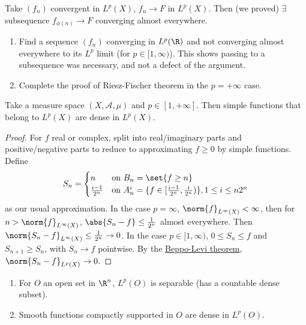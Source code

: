 \documentclass{article}
\begin{document}
\begin{remark}
    Take $(f_n)$ convergent in $L^p(X)$, $f_n \to F$ in $L^p(X)$. Then (we proved) $\exists$ subsequence $f_{\phi(n)} \to F$ converging almost everywhere.
\end{remark}
\begin{ex}
    \leavevmode
    \begin{enumerate}[label=\arabic*)]
        \item Find a sequence $(f_n)$ converging in $L^p(\R)$ and not converging almost everywhere to its $L^p$ limit (for $p \in [1, \infty)$). This shows passing to a subsequence was necessary, and not a defect of the argument.
        \item Complete the proof of Riesz-Fischer theorem in the $p=+\infty$ case.
    \end{enumerate}
\end{ex}

\begin{thm}
    Take a measure space $(X, \mathscr{A}, \mu)$ and $p \in [1, +\infty]$. Then simple functions that belong to $L^p(X)$ are dense in $L^p(X)$.
\end{thm}
\begin{proof}
    For $f$ real or complex, split into real/imaginary parts and positive/negative parts to reduce to approximating $f \geq 0$ by simple functions.
    Define
    \begin{equation*}
        S_n =
        \begin{cases}
            n & \text{on } B_n = \set{f \geq n} \\
            \frac{i-1}{2^n} & \text{on } A_n^i = \{f \in [\frac{i-1}{2^n}, \frac{i}{2^n})\}, 1 \leq i \leq n 2^n
        \end{cases}
    \end{equation*}
    as our usual approximation.
    In the case $p=\infty$, $\norm{f}_{L^\infty(X)} < \infty$, then for $n > \norm{f}_{L^\infty(X)}$, $\abs{S_n-f} \leq \frac{1}{2^n}$ almost everywhere. Then $\norm{S_n-f}_{L^\infty(X)} \leq \frac{1}{2^n} \to 0$.
    In the case $p \in [1, \infty)$, $0 \leq S_n \leq f$ and $S_{n+1} \geq S_n$, with $S_n \to f$ pointwise. By the \hyperlink{thm:Beppo}{Beppo-Levi theorem}, $\norm{S_n - f}_{L^p(X)} \to 0$.
\end{proof}

\begin{thm}[Density-separability of $L^p(\R^n)$, $p \in [1, +\infty)$]
    \leavevmode
    \begin{enumerate}[label=(\arabic*)]
        \item For $O$ an open set in $\R^n$, $L^p(O)$ is separable (has a countable dense subset).
        \item Smooth functions compactly supported in $O$ are dense in $L^p(O)$.
    \end{enumerate}
\end{thm}
\end{document}
